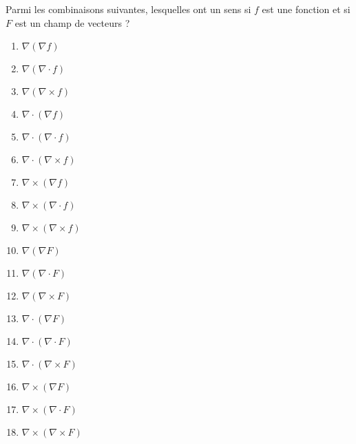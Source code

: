 
\begin{exercice}\label{exoOutilsMath-0035}

    Parmi les combinaisons suivantes, lesquelles ont un sens si $f$ est une fonction et si $F$ est un champ de vecteurs ?
    \begin{multicols}{3}
        \begin{enumerate}
            \item
                $\nabla(\nabla f)$
            \item
                $\nabla(\nabla\cdot f)$
            \item
                $\nabla(\nabla\times f)$
            \item
                $\nabla\cdot(\nabla f)$
            \item
                $\nabla\cdot(\nabla\cdot f)$
            \item
                $\nabla\cdot(\nabla\times f)$
            \item
                $\nabla\times(\nabla f)$
            \item
                $\nabla\times(\nabla\cdot f)$
            \item
                $\nabla\times(\nabla\times f)$
                
            \item
                $\nabla(\nabla F)$
            \item
                $\nabla(\nabla\cdot F)$
            \item
                $\nabla(\nabla\times F)$
            \item
                $\nabla\cdot(\nabla F)$
            \item
                $\nabla\cdot(\nabla\cdot F)$
            \item
                $\nabla\cdot(\nabla\times F)$
            \item
                $\nabla\times(\nabla F)$
            \item
                $\nabla\times(\nabla\cdot F)$
            \item
                $\nabla\times(\nabla\times F)$
                
                
                

        \end{enumerate}
    \end{multicols}
    

\end{exercice}
